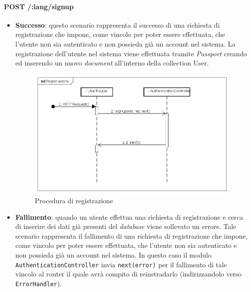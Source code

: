 \paragraph{POST /:lang/signup}
\begin{itemize}
\item \textbf{Successo}: questo scenario rappresenta il successo di una richiesta di registrazione che impone, come vincolo per poter essere effettuata, che l'utente non sia autenticato e non possieda già un account nel sistema. La registrazione dell'utente nel sistema viene effettuata tramite \textit{Passport} creando ed inserendo un nuovo \textit{document} all'interno della collection User.

\label{Procedura di registrazione}
\begin{figure}[ht]
	\centering
	\includegraphics[scale=0.40]{UML/DiagrammiDiSequenza/Back-end/POST__lang_signup_success.png}
	\caption{Procedura di registrazione}
\end{figure}
\FloatBarrier

\item \textbf{Fallimento}: quando un utente effettua una richiesta di registrazione e cerca di inserire dei dati già presenti del \textit{database} viene sollevato un errore. Tale scenario rappresenta il fallimento di una richiesta di registrazione che impone, come vincolo per poter essere effettuata, che l'utente non sia autenticato e non possieda già un account nel sistema. In questo caso il modulo \texttt{AuthenticationController} invia \texttt{next(error)} per il fallimento di tale vincolo al router il quale avrà compito di reinstradarlo (indirizzandolo verso \texttt{ErrorHandler}).


\end{itemize}
